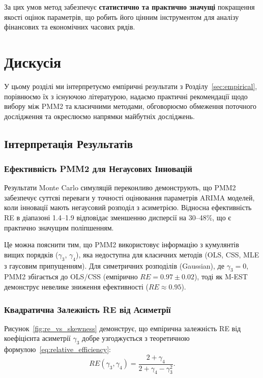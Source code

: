 \documentclass[12pt,a4paper]{article}
\begin{document}
За цих умов метод забезпечує \textbf{статистично та практично значущі} покращення якості оцінок параметрів, що робить його цінним інструментом для аналізу фінансових та економічних часових рядів.

\section{Дискусія}
\label{sec:discussion}

У цьому розділі ми інтерпретуємо емпіричні результати з Розділу~\ref{sec:empirical}, порівнюємо їх з існуючою літературою, надаємо практичні рекомендації щодо вибору між PMM2 та класичними методами, обговорюємо обмеження поточного дослідження та окреслюємо напрямки майбутніх досліджень.

\subsection{Інтерпретація Результатів}
\label{subsec:interpretation}

\subsubsection{Ефективність PMM2 для Негаусових Інновацій}

Результати Monte Carlo симуляцій переконливо демонструють, що PMM2 забезпечує суттєві переваги у точності оцінювання параметрів ARIMA моделей, коли інновації мають негаусовий розподіл з асиметрією. Відносна ефективність RE в діапазоні 1.4--1.9 відповідає зменшенню дисперсії на 30--48\%, що є практично значущим поліпшенням.

Це можна пояснити тим, що PMM2 використовує інформацію з кумулянтів вищих порядків ($\gamma_3$, $\gamma_4$), яка недоступна для класичних методів (OLS, CSS, MLE з гаусовим припущенням). Для симетричних розподілів (Gaussian), де $\gamma_3 = 0$, PMM2 збігається до OLS/CSS (емпірично $RE = 0.97 \pm 0.02$), тоді як M-EST демонструє невелике зниження ефективності ($RE \approx 0.95$).

\subsubsection{Квадратична Залежність RE від Асиметрії}

Рисунок~\ref{fig:re_vs_skewness} демонструє, що емпірична залежність RE від коефіцієнта асиметрії $\gamma_3$ добре узгоджується з теоретичною формулою~\eqref{eq:relative_efficiency}:
\begin{equation}
    RE(\gamma_3, \gamma_4) = \frac{2 + \gamma_4}{2 + \gamma_4 - \gamma_3^2}.
\end{equation}
\end{document}
